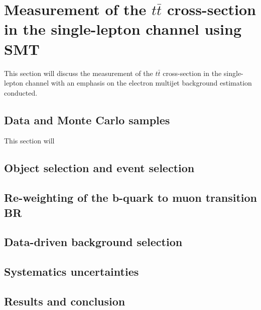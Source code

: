 
\chapter{Measurement of the $t\bar{t}$ cross-section in the single-lepton channel using SMT} \label{sec:cross_section}
This section will discuss the measurement of the $t\bar{t}$ cross-section in the single-lepton 
channel with an emphasis on the electron multijet background estimation conducted.
\section{Data and Monte Carlo samples} \label{sec:data_and_monte_carlo_samples}
This section will 
\section{Object selection and event selection} \label{sec:xsection_event_selection}
\section{Re-weighting of the b-quark to muon transition BR} \label{sec:b_mu}
\section{Data-driven background selection} \label{sec:data_driven_background_selection}
\section{Systematics uncertainties} \label{sec:systematics_uncertainties}
\section{Results and conclusion} \label{sec:results_and_conclusion}